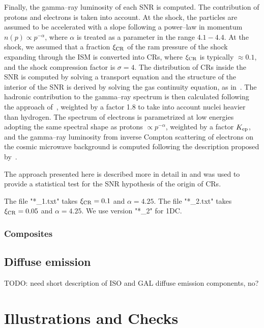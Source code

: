 \documentclass{article}
\begin{document}
Finally, the gamma--ray luminosity of each SNR is computed. The contribution of protons and electrons is taken into account. At the shock, the particles are assumed to be accelerated with a slope following a power--law in momentum $n(p) \propto p^{-\alpha}$, where $\alpha$ is treated as a parameter in the range $4.1 - 4.4$. At the shock, we assumed that a fraction $\xi_{\rm CR}$ of the ram pressure of the shock expanding through the ISM is converted into CRs, where $\xi_{\rm CR}$ is typically $\approx 0.1$, and the shock compression factor is $\sigma=4$.  
The distribution of CRs inside the SNR is computed by solving a transport equation and the structure of the interior of the SNR is derived by solving the gas continuity equation, as in~\cite{pz03,pz05}.
The hadronic contribution to the gamma--ray spectrum is then calculated following the approach of~\cite{kelner2006}, weighted by a factor 1.8 to take into account nuclei heavier than hydrogen. 
The spectrum of electrons is parametrized at low energies adopting the same spectral shape as protons $\propto p^{-\alpha}$, weighted by a factor $K_{\rm ep}$, and the gamma--ray luminosity from inverse Compton scattering of electrons on the cosmic microwave background is computed following the description proposed by~\cite{gould}.

The approach presented here is described more in detail in \cite{cristofari2013,cristofari2017} and was used to provide a statistical test for the SNR hypothesis of the origin of CRs. 

The file "*_1.txt" takes  $\xi_{\rm CR}=0.1$ and $\alpha=4.25$.
The file "*_2.txt" takes  $\xi_{\rm CR}=0.05$ and $\alpha=4.25$.
We use version "*_2" for 1DC.



\subsubsection{Composites}

\subsection{Diffuse emission}

TODO: need short description of ISO and GAL diffuse emission components, no?

\section{Illustrations and Checks}
\end{document}
